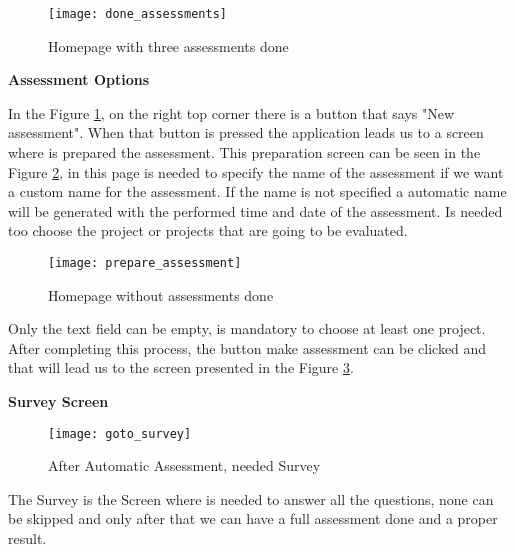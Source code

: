 \begin{figure}[h]
	\begin{center}
		\leavevmode
		\texttt{[image: done\_assessments]}
		\caption{Homepage with three assessments done}
		\label{fig:done_assessments}
	\end{center}
\end{figure}


\vspace{10 mm}

\textbf{Assessment Options}

In the Figure \ref{fig:done_assessments}, on the right top corner there is a button that says "New assessment". When that button is pressed the application leads us to a screen where is prepared the assessment. This preparation screen can be seen in the Figure \ref{fig:prepare_assessment}, in this page is needed to specify the name of the assessment if we want a custom name for the assessment. If the name is not specified a automatic name will be generated with the performed time and date of the assessment. Is needed too choose the project or projects that are going to be evaluated.

\begin{figure}[h]
	\begin{center}
		\leavevmode
		\texttt{[image: prepare\_assessment]}
		\caption{Homepage without assessments done}
		\label{fig:prepare_assessment}
	\end{center}
\end{figure}

Only the text field can be empty, is mandatory to choose at least one project. After completing this process, the button make assessment can be clicked and that will lead us to the screen presented in the Figure \ref{fig:goto_survey}.

\vspace{10 mm}

\textbf{Survey Screen}

\begin{figure}[h]
	\begin{center}
		\leavevmode
		\texttt{[image: goto\_survey]}
		\caption{After Automatic Assessment, needed Survey}
		\label{fig:goto_survey}
	\end{center}
\end{figure}

The Survey is the Screen where is needed to answer all the questions, none can be skipped and only after that we can have a full assessment done and a proper result.

